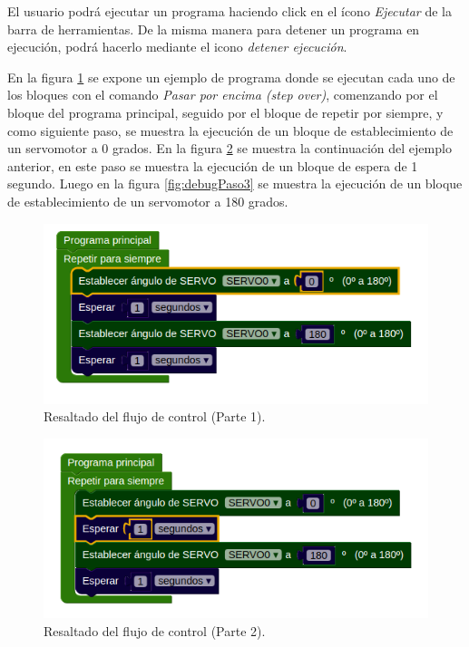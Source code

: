 El usuario podrá ejecutar un programa haciendo click en el ícono \emph{Ejecutar} de la barra de herramientas. De la misma manera para detener un programa en ejecución, podrá hacerlo mediante el icono \emph{detener ejecución}.

En la figura \ref{fig:debugPaso1} se expone un ejemplo de programa donde se ejecutan cada uno de los bloques con el comando  \emph{Pasar por encima (step over)}, comenzando por el bloque del programa principal, seguido por el bloque de repetir por siempre, y como siguiente paso, se muestra la ejecución de un bloque de establecimiento de un servomotor a 0 grados. En la figura \ref{fig:debugPaso2} se muestra la continuación del ejemplo anterior, en este paso se
muestra la ejecución de un bloque de espera de 1 segundo. Luego en la figura \ref{fig:debugPaso3} se
muestra la ejecución de un bloque de establecimiento de un servomotor a 180 grados.


\begin{figure}[!htbp]
	\begin{center}  %
		\includegraphics[width=12cm]{./Figures/debugPaso1.PNG}
		\par\caption{Resaltado del flujo de control (Parte 1).}\label{fig:debugPaso1}
	\end{center}
\end{figure}

\begin{figure}[!htbp]
	\begin{center}  %
		\includegraphics[width=12cm]{./Figures/debugPaso2.PNG}
		\par\caption{Resaltado del flujo de control (Parte 2).}\label{fig:debugPaso2}
	\end{center}
\end{figure}

